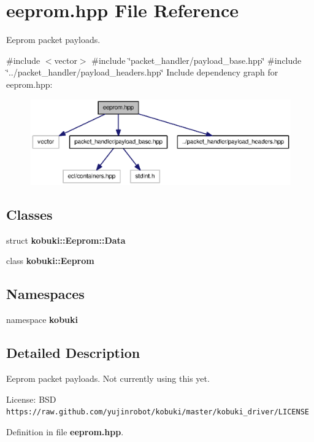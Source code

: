 \section{eeprom.\-hpp \-File \-Reference}
\label{eeprom_8hpp}


\-Eeprom packet payloads.  


{\ttfamily \#include $<$vector$>$}\*
{\ttfamily \#include \char`\"{}packet\-\_\-handler/payload\-\_\-base.\-hpp\char`\"{}}\*
{\ttfamily \#include \char`\"{}../packet\-\_\-handler/payload\-\_\-headers.\-hpp\char`\"{}}\*
\-Include dependency graph for eeprom.\-hpp\-:
\nopagebreak
\begin{figure}[H]
\begin{center}
\leavevmode
\includegraphics[width=350pt]{eeprom_8hpp__incl}
\end{center}
\end{figure}
\subsection*{\-Classes}
\begin{DoxyCompactItemize}
\item 
struct {\bf kobuki\-::\-Eeprom\-::\-Data}
\item 
class {\bf kobuki\-::\-Eeprom}
\end{DoxyCompactItemize}
\subsection*{\-Namespaces}
\begin{DoxyCompactItemize}
\item 
namespace {\bf kobuki}
\end{DoxyCompactItemize}


\subsection{\-Detailed \-Description}
\-Eeprom packet payloads. \-Not currently using this yet.

\-License\-: \-B\-S\-D {\tt https\-://raw.\-github.\-com/yujinrobot/kobuki/master/kobuki\-\_\-driver/\-L\-I\-C\-E\-N\-S\-E} 

\-Definition in file {\bf eeprom.\-hpp}.

